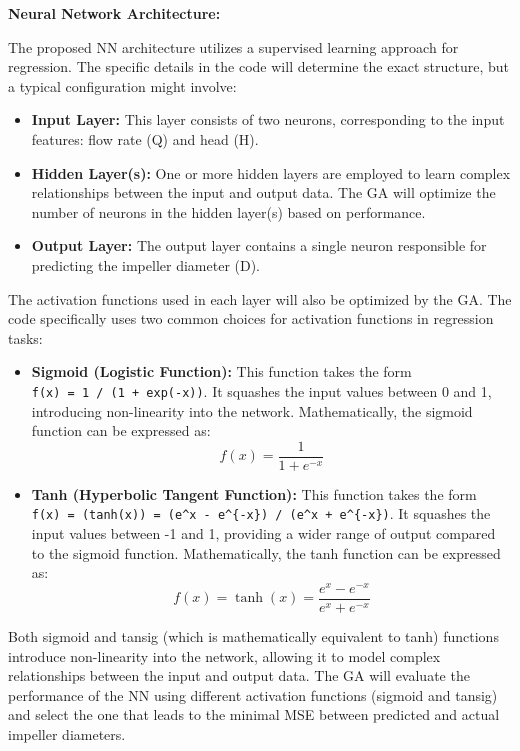 \documentclass[
  super,
  review,
  3p]{elsarticle}
\providecommand{\tightlist}{%
  \setlength{\itemsep}{0pt}\setlength{\parskip}{0pt}}\usepackage{longtable,booktabs,array}
\begin{document}
\textbf{Neural Network Architecture:}

The proposed NN architecture utilizes a supervised learning approach for
regression. The specific details in the code will determine the exact
structure, but a typical configuration might involve:

\begin{itemize}
\tightlist
\item
  \textbf{Input Layer:} This layer consists of two neurons,
  corresponding to the input features: flow rate (Q) and head (H).
\item
  \textbf{Hidden Layer(s):} One or more hidden layers are employed to
  learn complex relationships between the input and output data. The GA
  will optimize the number of neurons in the hidden layer(s) based on
  performance.
\item
  \textbf{Output Layer:} The output layer contains a single neuron
  responsible for predicting the impeller diameter (D).
\end{itemize}

The activation functions used in each layer will also be optimized by
the GA. The code specifically uses two common choices for activation
functions in regression tasks:

\begin{itemize}
\item
  \textbf{Sigmoid (Logistic Function):} This function takes the form
  \texttt{f(x)\ =\ 1\ /\ (1\ +\ exp(-x))}. It squashes the input values
  between 0 and 1, introducing non-linearity into the network.
  Mathematically, the sigmoid function can be expressed as: \[
  f(x) = \frac{1}{1 + e^{-x}}
  \]
\item
  \textbf{Tanh (Hyperbolic Tangent Function):} This function takes the
  form
  \texttt{f(x)\ =\ (tanh(x))\ =\ (e\^{}x\ -\ e\^{}\{-x\})\ /\ (e\^{}x\ +\ e\^{}\{-x\})}.
  It squashes the input values between -1 and 1, providing a wider range
  of output compared to the sigmoid function. Mathematically, the tanh
  function can be expressed as: \[
  f(x) = \tanh(x) = \frac{e^x - e^{-x}}{e^x + e^{-x}}
  \]
\end{itemize}

Both sigmoid and tansig (which is mathematically equivalent to tanh)
functions introduce non-linearity into the network, allowing it to model
complex relationships between the input and output data. The GA will
evaluate the performance of the NN using different activation functions
(sigmoid and tansig) and select the one that leads to the minimal MSE
between predicted and actual impeller diameters.
\end{document}
